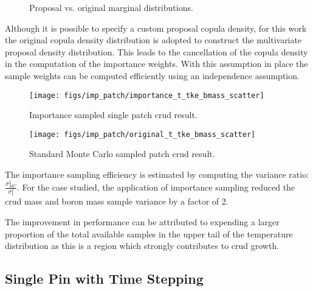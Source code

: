 \begin{figure}[H]%
    \centering
    \qquad
    \caption[]{Proposal vs. original marginal distributions.}%
    \label{fig:imp_sample2}%
\end{figure}

Although it is possible to specify a custom proposal copula density, for this work the original copula density distribution is adopted to construct the multivariate proposal density distribution.  This leads to the cancellation of the copula density in the computation of the importance weights.  With this assumption in place the sample weights can be computed efficiently using an independence assumption.

\begin{figure}[H]
    \centering
    \texttt{[image: figs/imp\_patch/importance\_t\_tke\_bmass\_scatter]}
    \caption[Importance sampled single patch crud result.]{Importance sampled single patch crud result.}
    \label{fig:importancettkebmassscatter}
\end{figure}

\begin{figure}[H]
    \centering
    \texttt{[image: figs/imp\_patch/original\_t\_tke\_bmass\_scatter]}
    \caption[Standard Monte Carlo sampled patch crud result.]{Standard Monte Carlo sampled patch crud result.}
    \label{fig:originalttkebmassscatter}
\end{figure}

The importance sampling efficiency is estimated by computing the variance ratio:  $\frac{\sigma^2_{MC}}{\sigma^2_{I}}$.  For the case studied, the application of importance sampling reduced the crud mass and boron mass sample variance by a factor of 2.

The improvement in performance can be attributed to expending a larger proportion of the total available samples in the upper tail of the temperature distribution as this is a region which strongly contributes to crud growth.


\subsection{Single Pin with Time Stepping}

